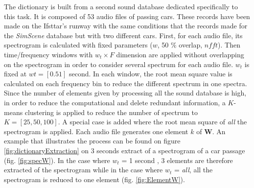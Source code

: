\documentclass[twocolumn,a4paper,10pt]{article}
\begin{document}
The dictionary is built from a second sound database dedicated specifically to this task. It is composed of 53 audio files of passing cars. These records have been made on the Ifsttar's runway with the same conditions that the records made for the \textit{SimScene} database but with two different cars. First, for each audio file, its spectrogram is calculated with fixed parameters ($w$, 50 $\%$ overlap, $nfft$). Then time/frequency windows with $w_t \times F$ dimension are applied without overlapping on the spectrogram in order to consider several spectrum for each audio file. $w_t$ is fixed at $wt = [0.5 1]$ second. In each window, the root mean square value is calculated on each frequency bin to reduce the different spectrum in one spectra. Since the number of elements given by processing all the sound database is high, in order to reduce the computational and delete redundant information, a $K$-means clustering is applied to reduce the number of spectrum to $K = \left[ 25, 50, 100 \right]$. A special case is added where the root mean square of \textit{all} the spectrogram is applied. Each audio file generates one element $k$ of $\mathbf{W}$. An example that illustrates the process can be found on figure \ref{fig:dictionaryExtraction} on 3 seconds extract of a spectrogram of a car passage (fig. \ref{fig:specW}). In the case where $w_t$ = 1 second , 3 elements are therefore extracted of the spectrogram while in the case where $w_t$ = \textit{all}, all the spectrogram is reduced to one element (fig. \ref{fig:ElementW}).
\end{document}
